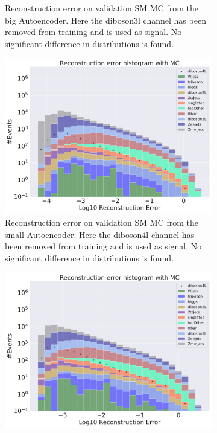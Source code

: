 \begin{figure}[H]
\begin{subfigure}{.45\textwidth}
        \caption{Reconstruction error on validation SM MC from the big Autoencoder. Here the diboson3l channel has been removed from training and 
        is used as signal. No significant difference in distributions is found. }
        \label{fig:ae_big_diboson3l}
    \end{subfigure}
    \hfill
    \begin{subfigure}{.45\textwidth}
        \includegraphics[width=\textwidth]{Figures/AE_testing/small/b_data_recon_big_rm3_feats_sig_diboson4l.pdf}
        \caption{Reconstruction error on validation SM MC from the small Autoencoder. Here the diboson4l channel has been removed from training and 
        is used as signal. No significant difference in distributions is found. }
        \label{fig:ae_small_diboson4l}
    \end{subfigure}
    \hfill 
    \begin{subfigure}{.45\textwidth}
        \includegraphics[width=\textwidth]{Figures/AE_testing/big/b_data_recon_big_rm3_feats_sig_diboson4l.pdf}

\end{subfigure}
\end{figure}
